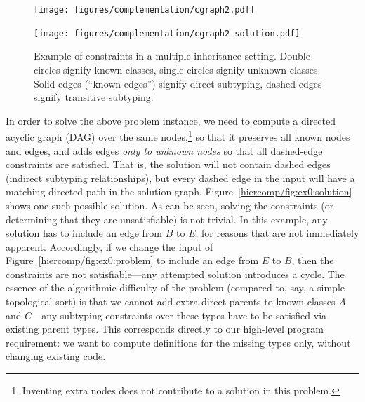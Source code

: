 \begin{figure}
  \begin{minipage}[b]{.5\linewidth}
    \centering
    \texttt{[image: figures/complementation/cgraph2.pdf]}
    \label{hiercomp/fig:ex0:problem}
  \end{minipage}
  \begin{minipage}[b]{.5\linewidth}
    \centering
    \texttt{[image: figures/complementation/cgraph2-solution.pdf]}
    \label{hiercomp/fig:ex0:solution}
  \end{minipage}
  \caption[Example of constraints in a multiple inheritance setting]{%
    Example of constraints in a multiple inheritance
    setting. Double-circles signify known classes, single circles
    signify unknown classes. Solid edges (``known edges'') signify
    direct subtyping, dashed edges signify transitive subtyping.}
  \label{hiercomp/fig:ex0}
\end{figure}

In order to solve the above problem instance, we need to compute a
directed acyclic graph (DAG) over the same nodes,\footnote{Inventing
extra nodes does not contribute to a solution in this problem.} so
that it preserves all known nodes and edges, and adds edges \emph{only
to unknown nodes} so that all dashed-edge constraints are
satisfied. That is, the solution will not contain dashed edges
(indirect subtyping relationships), but every dashed edge in the input
will have a matching directed path in the solution
graph. Figure~\ref{hiercomp/fig:ex0:solution} shows one such possible solution.
As can be seen, solving the constraints (or determining that they are
unsatisfiable) is not trivial. In this example, any solution has to
include an edge from $B$ to $E$, for reasons that are not immediately
apparent. Accordingly, if we change the input of
Figure~\ref{hiercomp/fig:ex0:problem} to include an edge from $E$ to $B$, then
the constraints are not satisfiable---any attempted solution
introduces a cycle. The essence of the algorithmic difficulty of the
problem (compared to, say, a simple topological sort) is that we
cannot add extra direct parents to known classes $A$ and $C$---any
subtyping constraints over these types have to be satisfied via
existing parent types. This corresponds directly to our high-level
program requirement: we want to compute definitions for the missing
types only, without changing existing code.


